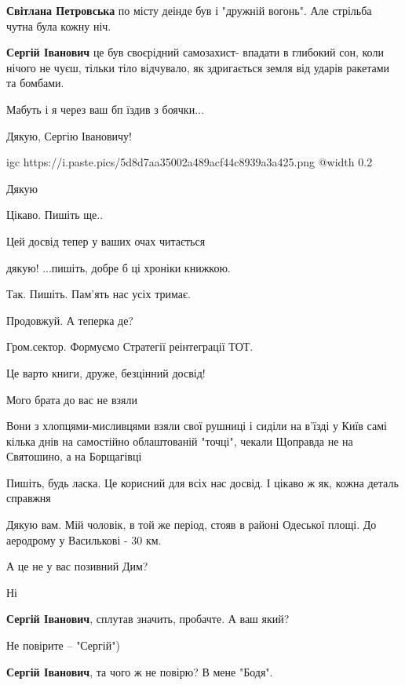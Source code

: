 \begin{itemize} %
\textbf{Світлана Петровська} по місту деінде був і "дружній вогонь". Але стрільба чутна була кожну ніч.

\textbf{Сергій Іванович} це був своєрідний самозахист- впадати в глибокий сон, коли нічого не чуєш, тільки тіло відчувало, як здригається земля від ударів ракетами та бомбами.
\end{itemize} %


Мабуть і я через ваш бп їздив з боячки...

Дякую, Сергію Івановичу!💛💙


\ifcmt
  igc https://i.paste.pics/5d8d7aa35002a489acf44c8939a3a425.png
	@width 0.2
\fi


Дякую 🌿


Цікаво. Пишіть ще..

Цей досвід тепер у ваших очах читається


дякую! ...пишіть, добре б ці хроніки книжкою.


Так. Пишіть. Пам'ять нас усіх тримає.

Продовжуй. А теперка де?

\begin{itemize} %
Гром.сектор. Формуємо Стратегії реінтеграції ТОТ.
\end{itemize} %



Це варто книги, друже, безцінний досвід!


Мого брата до вас не взяли

Вони з хлопцями-мисливцями взяли свої рушниці і сиділи на в'їзді у Київ самі
кілька днів на самостійно облаштованій "точці", чекали Щоправда не на
Святошино, а на Борщагівці


Пишіть, будь ласка. Це корисний для всіх нас досвід. І цікаво ж як, кожна деталь справжня


Дякую вам. Мій чоловік, в той же період, стояв в районі Одеської площі. До аеродрому у Василькові - 30 км.


А це не у вас позивний Дим?

\begin{itemize} %
Ні

\textbf{Сергій Іванович}, сплутав значить, пробачте. А ваш який?


Не повірите – "Сергій")

\textbf{Сергій Іванович}, та чого ж не повірю? В мене "Бодя". 🙂
\end{itemize} %
